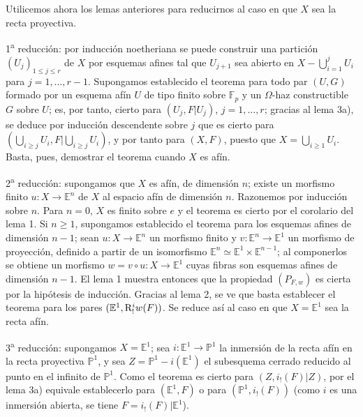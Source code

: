 Utilicemos ahora los lemas anteriores para reducirnos al caso en que $X$ sea la recta proyectiva.

1\textsuperscript{a} reducción: por inducción noetheriana se puede construir una partición $(U_j)_{1\le j\le r}$ de $X$ por esquemas afines tal que $U_{j+1}$ sea abierto en $X-\bigcup_{i=1}^jU_i$ para $j=1,\ldots,r-1$. Supongamos establecido el teorema para todo par $(U,G)$ formado por un esquema afín $U$ de tipo finito sobre $\mathbb F_p$ y un $\Omega$-haz constructible $G$ sobre $U$; es, por tanto, cierto para $(U_j,F|U_j)$, $j=1,\ldots,r$; gracias al lema 3a), se deduce por inducción descendente sobre $j$ que es cierto para $(\bigcup_{i\ge j}U_i,F|\bigcup_{i\ge j}U_i)$, y por tanto para $(X,F)$, puesto que $X=\bigcup_{i\ge1}U_i$. Basta, pues, demostrar el teorema cuando $X$ es afín.

2\textsuperscript{a} reducción: supongamos que $X$ es afín, de dimensión $n$; existe un morfismo finito $u:X\to\mathbb E^n$ de $X$ al espacio afín de dimensión $n$. Razonemos por inducción sobre $n$. Para $n=0$, $X$ es finito sobre $e$ y el teorema es cierto por el corolario del lema 1. Si $n\ge1$, supongamos establecido el teorema para los esquemas afines de dimensión $n-1$; sean $u:X\to\mathbb E^n$ un morfismo finito y $v:\mathbb E^n\to\mathbb E^1$ un morfismo de proyección, definido a partir de un isomorfismo $\mathbb E^n\simeq\mathbb E^1\times\mathbb E^{n-1}$; al componerlos se obtiene un morfismo $w=v\circ u:X\to\mathbb E^1$ cuyas fibras son esquemas afines de dimensión $n-1$. El lema 1 muestra entonces que la propiedad $(P_{F,w})$ es cierta por la hipótesis de inducción. Gracias al lema 2, se ve que basta establecer el teorema para los pares $(\mathbb E^1,\mathrm{R}^i_!w(F))$. Se reduce así al caso en que $X=\mathbb E^1$ sea la recta afín.

3\textsuperscript{a} reducción: supongamos $X=\mathbb E^1$; sea $i:\mathbb E^1\to\mathbb P^1$ la inmersión de la recta afín en la recta proyectiva $\mathbb P^1$, y sea $Z=\mathbb P^1-i(\mathbb E^1)$ el subesquema cerrado reducido al punto en el infinito de $\mathbb P^1$. Como el teorema es cierto para $(Z,i_!(F)|Z)$, por el lema 3a) equivale establecerlo para $(\mathbb E^1,F)$ o para $(\mathbb P^1,i_!(F))$ (como $i$ es una inmersión abierta, se tiene $F=i_!(F)|\mathbb E^1$).
